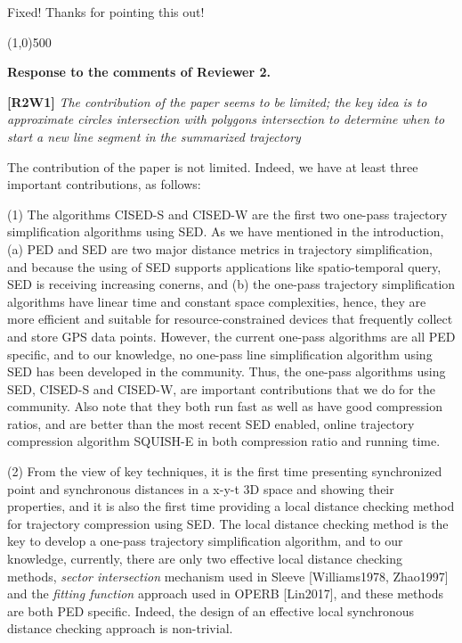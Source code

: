 \documentclass{letter}
\begin{document}
{Fixed! Thanks for pointing this out!

\line(1,0){500}

\textbf{Response to the comments of Reviewer 2.}

\textbf{[R2W1]} \emph{The contribution of the paper seems to be limited; the key idea is to approximate circles intersection with polygons intersection to determine when to start a new line segment in the summarized trajectory}

The contribution of the paper is not limited. Indeed, we have at least three important contributions, as follows:

(1) The algorithms CISED-S and CISED-W are the first two one-pass trajectory simplification algorithms using SED. As we have mentioned in the introduction, (a) PED and SED are two major distance metrics in trajectory simplification, and because the using of SED supports applications like spatio-temporal query, SED is receiving increasing conerns, and (b) the one-pass trajectory simplification algorithms have linear time and constant space complexities, hence, they are more efficient and suitable for resource-constrained devices that frequently collect and store GPS data points. However, the current one-pass algorithms are all PED specific, and to our knowledge, no one-pass line simplification algorithm using SED has been developed in the community. Thus, the one-pass algorithms using SED, CISED-S and CISED-W, are important contributions that we do for the community. Also note that they both run fast as well as have good compression ratios, and are better than the most recent SED enabled, online trajectory compression algorithm SQUISH-E in both compression ratio and running time.

(2) From the view of key techniques, it is the first time presenting synchronized point and synchronous distances in a x-y-t 3D space and showing their properties, and it is also the first time providing a local distance checking method for trajectory compression using SED. The local distance checking method is the key to develop a one-pass trajectory simplification algorithm, and to our knowledge, currently, there are only two effective local distance checking methods, \textit{sector intersection} mechanism used in Sleeve [Williams1978, Zhao1997] and the \textit{fitting function} approach used in OPERB [Lin2017], and these methods are both PED specific. Indeed, the design of an effective local synchronous distance checking approach is non-trivial.}
\end{document}

